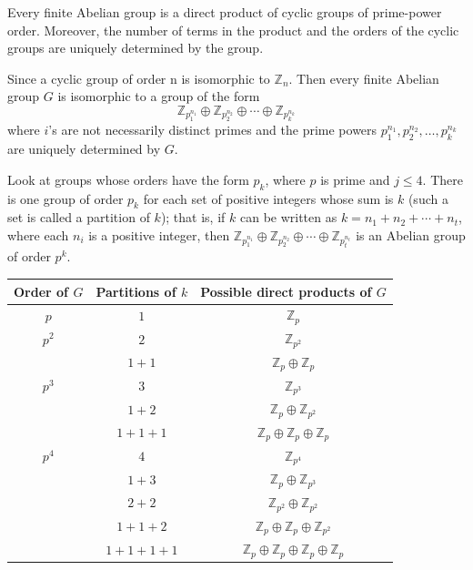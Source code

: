 \begin{theorem}
    Every finite Abelian group is a direct product of cyclic groups of 
prime-power order. Moreover, the number of terms in the product and the orders of 
the cyclic groups are uniquely determined by the group.

Since a cyclic group of order n is isomorphic to $\mathbb{Z}_n$. Then every finite Abelian group 
$G$ is isomorphic to a group of the form
\[
    \mathbb{Z}_{p_1^{n_1}} \oplus \mathbb{Z}_{p_2^{n_2}} \oplus \cdots \oplus \mathbb{Z}_{p_k^{n_k}}
\]
where $i$'s are not necessarily distinct primes and the prime powers $p_1^{n_1}, p_2^{n_2}, \ldots, p_k^{n_k}$ are uniquely 
determined by $G$.
\end{theorem}

 
Look at groups whose orders have the form $p_k$, where $p$ is prime and $j \leq 4$. There is 
one group of order $p_k$ for each set of positive integers whose sum is $k$ (such a set is 
called a partition of $k$); that is, if $k$ can be written as $k = n_1 + n_2 + \cdots + n_t$, where 
each $n_i$ is a positive integer, then $\mathbb{Z}_{p_1^{n_1}} \oplus \mathbb{Z}_{p_2^{n_2}} \oplus \cdots \oplus \mathbb{Z}_{p_t^{n_t}}
$ is an Abelian group 
of order $p^k$.

\begin{center}
    \begin{tabular}{c|c|c}
        Order of $G$ & Partitions of $k$ & Possible direct products of $G$\\[0.3em]
        \hline
        $p$ & $1$ & $\mathbb{Z}_p$\\[0.3em]
        \hline
        $p^2$ & $2$ & $\mathbb{Z}_{p^2}$\\[0.3em]
        & $1+1$ & $\mathbb{Z}_p \oplus \mathbb{Z}_p$\\[0.3em]
        \hline
        $p^3$ & $3$ & $\mathbb{Z}_{p^3}$\\[0.3em]
        & $1+2$ & $\mathbb{Z}_p \oplus \mathbb{Z}_{p^2}$\\[0.3em]
        & $1+1+1$ & $\mathbb{Z}_p \oplus \mathbb{Z}_p \oplus \mathbb{Z}_p$\\[0.3em]
        \hline
        $p^4$ & $4$ & $\mathbb{Z}_{p^4}$\\[0.3em]
        & $1+3$ & $\mathbb{Z}_p \oplus \mathbb{Z}_{p^3}$\\[0.3em]
        & $2+2$ & $\mathbb{Z}_{p^2} \oplus \mathbb{Z}_{p^2}$\\[0.3em]
        & $1+1+2$ & $\mathbb{Z}_p \oplus \mathbb{Z}_p \oplus \mathbb{Z}_{p^2}$\\[0.3em]
        & $1+1+1+1$ & $\mathbb{Z}_p \oplus \mathbb{Z}_p \oplus \mathbb{Z}_p \oplus \mathbb{Z}_p$\\[0.3em]
        \hline
    \end{tabular}
\end{center}

